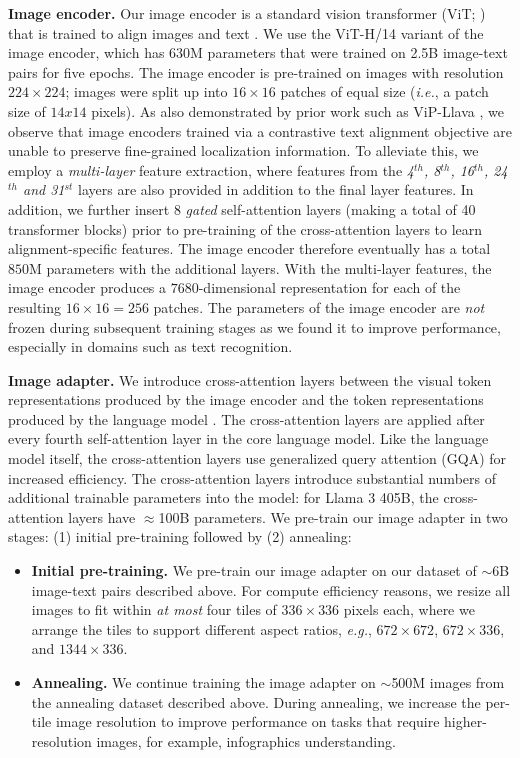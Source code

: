 \textbf{Image encoder.} Our image encoder is a standard vision transformer (ViT; \citet{dosovitskiy2020vit}) that is trained to align images and text \citep{xu2023demystifying}. We use the ViT-H/14 variant of the image encoder, which has 630M parameters that were trained on 2.5B image-text pairs for five epochs. The image encoder is pre-trained on images with resolution $224 \times 224$; images were split up into $16 \times 16$ patches of equal size (\emph{i.e.}, a patch size of $14x14$ pixels). As also demonstrated by prior work such as ViP-Llava \citep{cai2023vipllava}, we observe that image encoders trained via a contrastive text alignment objective are unable to preserve fine-grained localization information. To alleviate this, we employ a \emph{multi-layer} feature extraction, where features from the \emph{4$^{th}$, 8$^{th}$, 16$^{th}$, 24$^{th}$ and 31$^{st}$} layers are also provided in addition to the final layer features. In addition, we further insert 8 \emph{gated} self-attention layers (making a total of 40 transformer blocks) prior to pre-training of the cross-attention layers to learn alignment-specific features. The image encoder therefore eventually has a total $850$M parameters with the additional layers. With the multi-layer features, the image encoder produces a $7680$-dimensional representation for each of the resulting $16 \times 16\!=\!256$ patches. The parameters of the image encoder are \emph{not} frozen during subsequent training stages as we found it to improve performance, especially in domains such as text recognition.

\textbf{Image adapter.} We introduce cross-attention layers between the visual token representations produced by the image encoder and the token representations produced by the language model \citep{alayrac2022flamingo}. The cross-attention layers are applied after every fourth self-attention layer in the core language model. Like the language model itself, the cross-attention layers use generalized query attention (GQA) for increased efficiency. The cross-attention layers introduce substantial numbers of additional trainable parameters into the model: for Llama 3 405B, the cross-attention layers have $\approx$100B parameters. We pre-train our image adapter in two stages: (1) initial pre-training followed by (2) annealing:

\begin{itemize}
\item \textbf{Initial pre-training.} We pre-train our image adapter on our dataset of  $\sim$6B image-text pairs described above. For compute efficiency reasons, we resize all images to fit within \emph{at most} four tiles of $336 \times 336$ pixels each, where we arrange the tiles to support different aspect ratios, \emph{e.g.}, $672 \times 672$, $672 \times 336$, and $1344 \times 336$.

\item \textbf{Annealing.}
We continue training the image adapter on $\sim$500M images from the annealing dataset described above. During annealing, we increase the per-tile image resolution to improve performance on tasks that require higher-resolution images, for example, infographics understanding.
\end{itemize}


